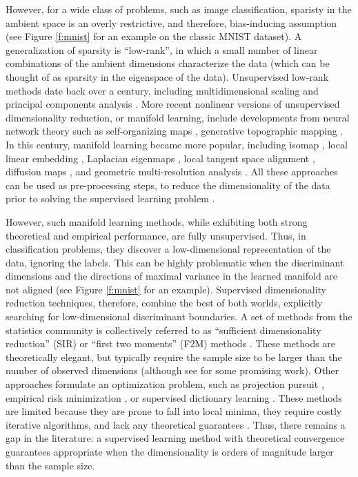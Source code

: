 \documentclass[10pt]{article}
\begin{document}
However, for a wide class of problems, such as image classification, sparisty in the ambient space is an overly restrictive, and therefore, bias-inducing assumption (see Figure \ref{f:mnist} for an example on the classic MNIST dataset). A generalization of sparsity is ``low-rank'', in which a  small number of linear combinations of the ambient dimensions characterize the data (which can be thought of as sparsity in the eigenspace of the data).  Unsupervised low-rank methods date back over a century, including multidimensional scaling \cite{Householder1938,Borg2005} and principal components analysis \cite{Pearson1901a,Jolliffe2002a}. More recent nonlinear versions of unsupervised dimensionality reduction, or manifold learning, include developments from neural network theory such as self-organizing maps \cite{Kohonen1982a}, generative topographic mapping \cite{Bishop1998a}. In this century, manifold learning became more popular, including isomap \cite{Tenenbaum2000a}, local linear embedding \cite{Roweis2000a}, Laplacian eigenmaps \cite{Belkin2003a}, local tangent space alignment \cite{Zhang2004f}, diffusion maps \cite{Coifman2006a},  and geometric multi-resolution analysis \cite{Allard2012}.  All these approaches can be used as pre-processing steps, to reduce the dimensionality of the data prior to solving the supervised learning problem \cite{Belhumeur1997a}.

However, such manifold learning methods, while exhibiting both strong theoretical \cite{Eckart1936a,deSilva2003, Allard2012} and empirical performance, are fully unsupervised.  Thus, in classification problems, they discover a low-dimensional representation of the data, ignoring the labels.  This can be highly problematic when the discriminant dimensions and the directions of maximal variance in the learned manifold are not aligned (see Figure \ref{f:mnist} for an example).  Supervised dimensionality reduction techniques, therefore, combine the best of both worlds, explicitly searching for low-dimensional discriminant boundaries.  A set of methods from the statistics community is collectively referred to as   ``sufficient dimensionality reduction'' (SIR) or ``first two moments'' (F2M) methods  \cite{Li1991a, Tishby1999a, Globerson2003a, Cook2005a,Fukumizu2004a}.  These methods are theoretically elegant, but typically require the sample size to be larger than the number of observed dimensions (although see \cite{Cook2013} for some promising work).  Other approaches formulate an optimization problem, such as projection pursuit \cite{Huber1985a}, empirical risk minimization \cite{Belkin2006a}, or supervised dictionary learning \cite{Mairal2009}.  These methods are limited because they are prone to fall into local minima, they require costly iterative algorithms, and lack any theoretical guarantees \cite{Belkin2006a}.   Thus, there remains a gap in the literature: a supervised learning method with theoretical convergence guarantees appropriate when the dimensionality is orders of magnitude larger than the sample size.
\end{document}
